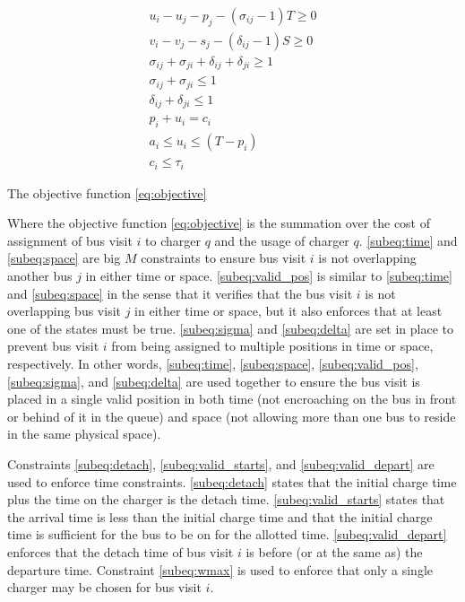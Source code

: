 \documentclass[letterpaper, 10pt, conference]{IEEEtran}
\begin{document}
\begin{subequations}
\label{eq:packconstrs}
\begin{align}
    u_i - u_j - p_j - (\sigma_{ij} - 1)T \geq 0                      \label{subeq:time}         \\
    v_i - v_j - s_j - (\delta_{ij} - 1)S \geq 0                      \label{subeq:space}        \\
    \sigma_{ij} + \sigma_{ji} + \delta_{ij} + \delta_{ji} \geq 1     \label{subeq:valid_pos}    \\
    \sigma_{ij} + \sigma_{ji} \leq 1                                 \label{subeq:sigma}        \\
    \delta_{ij} + \delta_{ji} \leq 1                                 \label{subeq:delta}        \\
    p_i + u_i = c_i                                                  \label{subeq:detach}       \\
    a_i \leq u_i \leq (T - p_i)                                      \label{subeq:valid_starts} \\
    c_i \leq \tau_i                                                  \label{subeq:valid_depart}
\end{align}
\end{subequations}

The objective function \eqref{eq:objective}

Where the objective function \eqref{eq:objective} is the summation over the cost of assignment of bus visit \(i\) to charger \(q\) and the usage of charger \(q\). \eqref{subeq:time} and \eqref{subeq:space} are big \(M\) constraints to ensure bus visit \(i\) is not overlapping another bus \(j\) in either time or space. \eqref{subeq:valid_pos} is similar to \eqref{subeq:time} and \eqref{subeq:space} in the sense that it verifies that the bus visit \(i\) is not overlapping bus visit \(j\) in either time or space, but it also enforces that at least one of the states must be true. \eqref{subeq:sigma} and \eqref{subeq:delta} are set in place to prevent bus visit \(i\) from being assigned to multiple positions in time or space, respectively. In other words, \eqref{subeq:time}, \eqref{subeq:space}, \eqref{subeq:valid_pos}, \eqref{subeq:sigma}, and \eqref{subeq:delta} are used together to ensure the bus visit is placed in a single valid position in both time (not encroaching on the bus in front or behind of it in the queue) and space (not allowing more than one bus to reside in the same physical space).

 Constraints \eqref{subeq:detach}, \eqref{subeq:valid_starts}, and \eqref{subeq:valid_depart} are used to enforce time constraints. \eqref{subeq:detach} states that the initial charge time plus the time on the charger is the detach time. \eqref{subeq:valid_starts} states that the arrival time is less than the initial charge time and that the initial charge time is sufficient for the bus to be on for the allotted time. \eqref{subeq:valid_depart} enforces that the detach time of bus visit \(i\) is before (or at the same as) the departure time. Constraint \eqref{subeq:wmax} is used to enforce that only a single charger may be chosen for bus visit \(i\).
\end{document}
